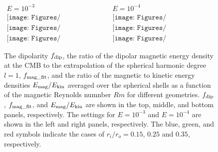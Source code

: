 \begin{figure}
\begin{center}
\[
\begin{array}{cc}
\mbox{$E = 10^{-3}$} &
\mbox{$E = 10^{-4}$} \\
\texttt{[image: Figures/fdip\_vs\_Rm\_Ek3.pdf]} &
\texttt{[image: Figures/fdip\_vs\_Rm\_Ek4.pdf]} \\
\texttt{[image: Figures/ffit\_vs\_Rm\_Ek3.pdf]} &
\texttt{[image: Figures/ffit\_vs\_Rm\_Ek4.pdf]} \\
\texttt{[image: Figures/Eratio\_vs\_Rm\_Ek3.pdf]} &
\texttt{[image: Figures/Eratio\_vs\_Rm\_Ek4.pdf]}
\end{array}
\]
\end{center}
\caption{The dipolarity $f_{\rm dip}$, the ratio of the dipolar magnetic energy density at the CMB to the extrapolation of the spherical harmonic degree $l = 1$, $f_{\rm mag\_fit}$, and the ratio of the magnetic to kinetic energy densities $E_{\rm mag} / E_{\rm kin}$ averaged over the spherical shells as a function of the magnetic Reynolds numnber $Rm$ for different geometries. $f_{\rm dip}$,  $f_{\rm mag\_fit}$, and $E_{\rm mag} / E_{\rm kin}$ are shown in the top, middle, and bottom panels, respectively. The settings for $E = 10^{-3}$ and $E = 10^{-4}$ are shown in the left and right panels, respectively. The blue, green, and red symbols indicate the cases of $r_{i} / r_{o} = 0.15$, $0.25$ and $0.35$, respectively. 
}
\label{fig:fdip_fit_Eratio}
\end{figure}